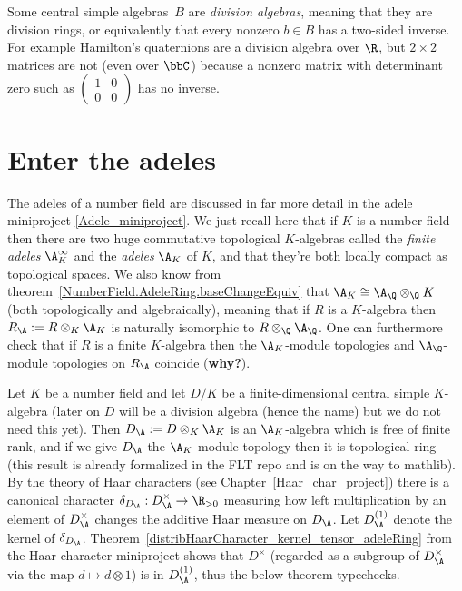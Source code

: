 Some central simple algebras~$B$ are \emph{division algebras}, meaning that they are division
rings, or equivalently that every nonzero $b\in B$ has a two-sided inverse. For example
Hamilton's quaternions are a division algebra over $\R$, but $2\times 2$ matrices are not
(even over $\bbC$) because a nonzero matrix with determinant zero such as
$\begin{pmatrix}1&0\\0&0\end{pmatrix}$ has no inverse.

\section{Enter the adeles}

The adeles of a number field are discussed in far more detail
in the adele miniproject \ref{Adele_miniproject}. We just recall here that if $K$ is a number field
then there are two huge commutative topological $K$-algebras called the \emph{finite adeles}
$\A_K^\infty$ and the \emph{adeles} $\A_K$ of $K$, and that they're both locally compact
as topological spaces. We also know from theorem~\ref{NumberField.AdeleRing.baseChangeEquiv}
that $\A_K\cong\A_{\Q}\otimes_{\Q}K$ (both topologically and algebraically), meaning
that if $R$ is a $K$-algebra then $R_{\A} := R\otimes_K\A_K$ is naturally isomorphic
to $R\otimes_{\Q}\A_{\Q}$. One can
furthermore check that if $R$ is a finite $K$-algebra then the $\A_K$-module topologies and $\A_{\Q}$-module
topologies on $R_{\A}$ coincide ({\bf why?}).

Let $K$ be a number field and let $D/K$ be a finite-dimensional central simple $K$-algebra
(later on $D$ will be a division algebra (hence the name) but we do not need this yet).
Then $D_{\A}:=D\otimes_K\A_K$ is an $\A_K$-algebra which
is free of finite rank, and if we give $D_{\A}$ the $\A_K$-module topology then it is
topological ring (this result is already formalized in the FLT repo and is on the way
to mathlib). By the theory of Haar characters (see Chapter~\ref{Haar_char_project})
there is a canonical character $\delta_{D_{\A}}:D_{\A}^\times\to\R_{>0}$ measuring
how left multiplication by an element of $D_{\A}^\times$ changes the additive Haar
measure on $D_{\A}$. Let $D_{\A}^{(1)}$ denote the kernel of $\delta_{D_{\A}}$.
Theorem~\ref{distribHaarCharacter_kernel_tensor_adeleRing} from the
Haar character miniproject shows that $D^\times$ (regarded as a subgroup of $D_{\A}^\times$
via the map $d\mapsto d\otimes 1$) is in $D_{\A}^{(1)}$, thus the below theorem typechecks.

